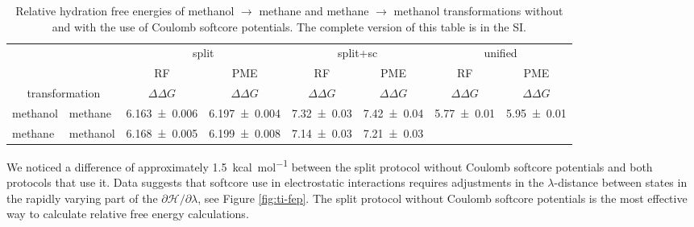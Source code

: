 \documentclass[journal=jctcce,manuscript=article]{achemso}
\begin{document}
\begin{table}[]
\centering
\caption{Relative hydration free energies of methanol $\rightarrow$ methane and methane $\rightarrow$
methanol transformations without and with the use of Coulomb softcore potentials. The complete version 
of this table is in the SI.}
\label{tab:eff-sc}
\begin{tabular}{@{}llclclcl@{}}
\toprule
 &  & \multicolumn{2}{c}{split} & \multicolumn{2}{c}{split+sc} & \multicolumn{2}{c}{unified} \\
 &  & RF & \multicolumn{1}{c}{PME} & RF & \multicolumn{1}{c}{PME} & RF & \multicolumn{1}{c}{PME} \\
\multicolumn{2}{c}{transformation} & $\Delta \Delta G$ & \multicolumn{1}{c}{$\Delta \Delta G$} & $\Delta \Delta G$ & \multicolumn{1}{c}{$\Delta \Delta G$} & $\Delta \Delta G$ & \multicolumn{1}{c}{$\Delta \Delta G$} \\ \midrule
methanol & methane & \multicolumn{1}{l}{\num{6.163 +- 0.006}} & \num{6.197 +- 0.004} & \multicolumn{1}{l}{\num{7.32+-0.03}} & \num{7.42+-0.04} & \multicolumn{1}{l}{\num{5.77 +- 0.01}} & \num{5.95 +- 0.01} \\
methane & methanol & \multicolumn{1}{l}{\num{6.168 +- 0.005}} & \num{6.199 +- 0.008} & \multicolumn{1}{l}{\num{7.14+-0.03}} & \num{7.21+-0.03} & \multicolumn{1}{l}{} &  \\ \bottomrule
\end{tabular}
\end{table}

We noticed a difference of approximately \SI{1.5}{kcal.mol^{-1}} between the split protocol without 
Coulomb softcore potentials and both protocols that use it. Data suggests that softcore use in 
electrostatic interactions requires adjustments in the $\lambda$-distance between states in the
rapidly varying part of the $\partial \mathcal{H}/\partial\lambda$, see Figure
\ref{fig:ti-fep}. 
The split protocol without Coulomb softcore potentials is the most effective way to calculate 
relative free energy calculations. 

\end{document}
